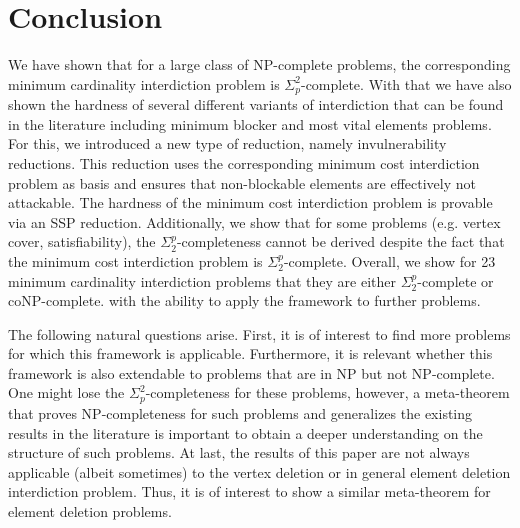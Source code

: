\section{Conclusion}
We have shown that for a large class of NP-complete problems, the corresponding minimum cardinality interdiction problem is $\Sigma^2_p$-complete.
With that we have also shown the hardness of several different variants of interdiction that can be found in the literature including minimum blocker and most vital elements problems.
For this, we introduced a new type of reduction, namely invulnerability reductions.
This reduction uses the corresponding minimum cost interdiction problem as basis and ensures that non-blockable elements are effectively not attackable.
The hardness of the minimum cost interdiction problem is provable via an SSP reduction.
Additionally, we show that for some problems (e.g. vertex cover, satisfiability), the $\Sigma^p_2$-completeness cannot be derived despite the fact that the minimum cost interdiction problem is $\Sigma^p_2$-complete.
Overall, we show for 23 minimum cardinality interdiction problems that they are either $\Sigma^p_2$-complete or coNP-complete.
with the ability to apply the framework to further problems.

The following natural questions arise.
First, it is of interest to find more problems for which this framework is applicable.
Furthermore, it is relevant whether this framework is also extendable to problems that are in NP but not NP-complete.
One might lose the $\Sigma^2_p$-completeness for these problems, however, a meta-theorem that proves NP-completeness for such problems and generalizes the existing results in the literature is important to obtain a deeper understanding on the structure of such problems.
At last, the results of this paper are not always applicable (albeit sometimes) to the vertex deletion or in general element deletion interdiction problem.
Thus, it is of interest to show a similar meta-theorem for element deletion problems.

